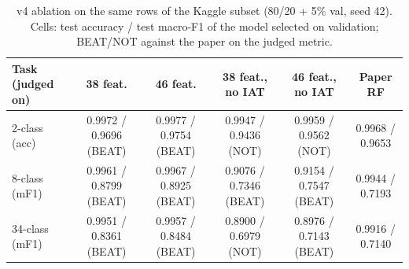 \begin{table}[!t]
\centering
\caption{v4 ablation on the same rows of the Kaggle subset (80/20 + 5\% val, seed 42). Cells: test accuracy / test macro-F1 of the model selected on validation; BEAT/NOT against the paper on the judged metric.}\label{tab:v4}
\scriptsize
\setlength{\tabcolsep}{3pt}
\begin{tabular}{lccccc}
\toprule
\textbf{Task (judged on)} & \textbf{38 feat.} & \textbf{46 feat.} & \textbf{38 feat., no IAT} & \textbf{46 feat., no IAT} & \textbf{Paper RF} \\
\midrule
2-class (acc) & 0.9972 / 0.9696 (BEAT) & 0.9977 / 0.9754 (BEAT) & 0.9947 / 0.9436 (NOT) & 0.9959 / 0.9562 (NOT) & 0.9968 / 0.9653 \\
8-class (mF1) & 0.9961 / 0.8799 (BEAT) & 0.9967 / 0.8925 (BEAT) & 0.9076 / 0.7346 (BEAT) & 0.9154 / 0.7547 (BEAT) & 0.9944 / 0.7193 \\
34-class (mF1) & 0.9951 / 0.8361 (BEAT) & 0.9957 / 0.8484 (BEAT) & 0.8900 / 0.6979 (NOT) & 0.8976 / 0.7143 (BEAT) & 0.9916 / 0.7140 \\
\bottomrule
\end{tabular}
\end{table}
